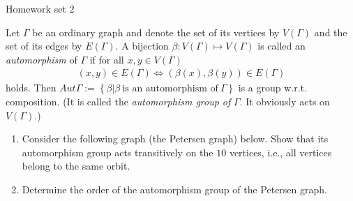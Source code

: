 \documentclass{article}
\begin{document}
\maketitle
Homework set 2 

\pagebreak

\begin{homeworkProblem}
    Let $\Gamma$ be an ordinary graph and denote the set of its 
    vertices by $V(\Gamma)$ and the set of its edges by $E(\Gamma)$.
    A bijection $\beta: V(\Gamma) \mapsto V(\Gamma)$ is
    called an \textit{automorphism} of $\Gamma$ if 
    for all $x,y \in V(\Gamma)$
    \begin{align}
        (x,y) \in E(\Gamma) \iff (\beta(x), \beta(y)) \in E(\Gamma)
    \end{align}
    holds. Then $Aut \Gamma := \left\{ \beta | \beta \ \text{is an automorphism of} \ \Gamma \right\}$
    is a group w.r.t. composition. 
    (It is called the \textit{automorphism group of} $\Gamma$. 
    It obviously acts on $V(\Gamma)$.)
    \begin{enumerate}
        \item Consider the following graph (the Petersen graph) below.
            Show that its automorphism group acts transitively
            on the $10$ vertices, i.e., all vertices belong to the same orbit.\\
        \item Determine the order of the automorphism group of the Petersen graph.
    \end{enumerate}
    

    


    
\end{homeworkProblem}

\pagebreak
\end{document}
